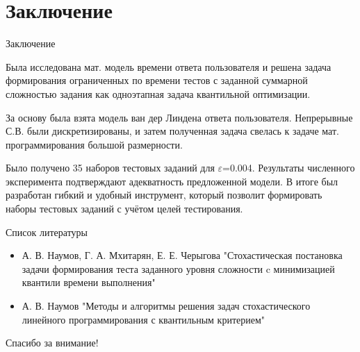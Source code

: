 \documentclass[aspectratio=169]{beamer}
\begin{document}
\section{Заключение}
\begin{frame}{Заключение}
    \small
    \begin{block}{}
    Была исследована мат. модель времени ответа пользователя и решена задача формирования ограниченных по времени тестов с заданной суммарной сложностью задания как одноэтапная задача квантильной оптимизации.
    \end{block}
    
    \begin{block}{}
    За основу была взята модель ван дер Линдена ответа пользователя. Непрерывные С.В. были дискретизированы, и затем полученная задача свелась к задаче мат. программирования большой размерности.
    \end{block}
    
    \begin{block}{}
    Было получено 35 наборов тестовых заданий для $\varepsilon$=0.004. Результаты численного эксперимента подтверждают адекватность предложенной модели. В итоге был разработан гибкий и удобный инструмент, который позволит формировать наборы тестовых заданий с учётом целей тестирования.
    \end{block}
    \normalsize
\end{frame}
    
    \begin{frame}{Список литературы}
        \begin{itemize}
  			\item А. В. Наумов, Г. А. Мхитарян, Е. Е. Черыгова "Стохастическая постановка задачи формирования теста заданного уровня сложности c минимизацией квантили времени выполнения"
  			\item А. В. Наумов "Методы и алгоритмы решения задач стохастического линейного программирования с квантильным критерием"
		\end{itemize}
    \end{frame}

    \begin{frame}
        \centering
        \huge
        Спасибо за внимание!\\
    \end{frame}
\end{document}
